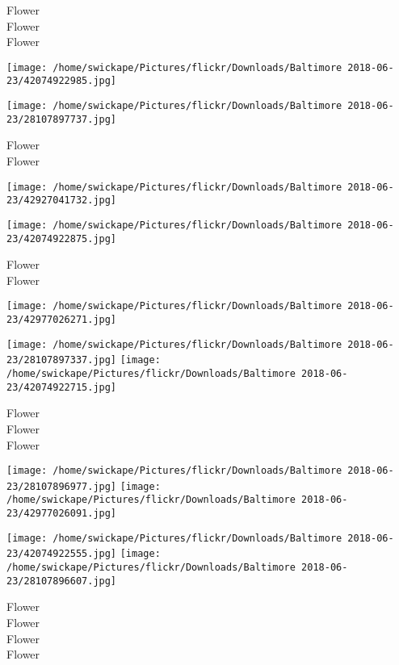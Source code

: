 \documentclass[10pt,letterpaper]{article}
\begin{document}
Flower\\
Flower\\
Flower\\
\pagebreak

\texttt{[image: /home/swickape/Pictures/flickr/Downloads/Baltimore 2018-06-23/42074922985.jpg]}

\vspace{0.25in}
\texttt{[image: /home/swickape/Pictures/flickr/Downloads/Baltimore 2018-06-23/28107897737.jpg]}

Flower\\
Flower\\
\pagebreak

\texttt{[image: /home/swickape/Pictures/flickr/Downloads/Baltimore 2018-06-23/42927041732.jpg]}

\vspace{0.25in}
\texttt{[image: /home/swickape/Pictures/flickr/Downloads/Baltimore 2018-06-23/42074922875.jpg]}

Flower\\
Flower\\
\pagebreak

\texttt{[image: /home/swickape/Pictures/flickr/Downloads/Baltimore 2018-06-23/42977026271.jpg]}

\vspace{0.25in}
\texttt{[image: /home/swickape/Pictures/flickr/Downloads/Baltimore 2018-06-23/28107897337.jpg]}
\texttt{[image: /home/swickape/Pictures/flickr/Downloads/Baltimore 2018-06-23/42074922715.jpg]}

Flower\\
Flower\\
Flower\\
\pagebreak

\texttt{[image: /home/swickape/Pictures/flickr/Downloads/Baltimore 2018-06-23/28107896977.jpg]}
\texttt{[image: /home/swickape/Pictures/flickr/Downloads/Baltimore 2018-06-23/42977026091.jpg]}

\texttt{[image: /home/swickape/Pictures/flickr/Downloads/Baltimore 2018-06-23/42074922555.jpg]}
\texttt{[image: /home/swickape/Pictures/flickr/Downloads/Baltimore 2018-06-23/28107896607.jpg]}

Flower\\
Flower\\
Flower\\
Flower\\
\pagebreak
\end{document}

